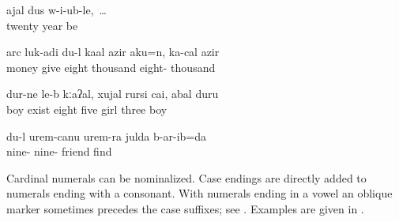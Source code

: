 \ea\label{ex:whenIwas20yearsold}
\gll	\vuvfr ajal dus w-i\uvfr-ub-le,~\ldots\\
	twenty year be\\
\glt	{}

\ex\label{ex:Iwouldhavegivenhimmoney}
\gll	arc luk\lmk-adi du-l k\lmk a\glpl al azir ak\lmk u=n, k\lmk a\glpl-c\ej al azir\\
	money give  eight thousand  eight- thousand\\
\glt	{}

\ex\label{ex:childrenarethere10}
\gll	dur\phfr-ne le-b kːaʔal, xujal rurs\lmk i cai, \eppl a\pha bal dur\phfr u\pha\\
	boy exist eight five girl  three boy\\
\glt	{}

\ex\label{ex:Ifound99friends}
\gll	du-l ur\paaf\ej em-c\ej anu ur\paaf\ej em-ra {julda\pafr} b-ar\paaf\lmk-ib=da\\
	 nine- nine- friend find\\
\glt	{}
\z

Cardinal numerals can be nominalized. Case endings are directly added to numerals ending with a consonant. With numerals ending in a vowel an oblique marker  sometimes precedes the case suffixes; see . Examples are given in .


